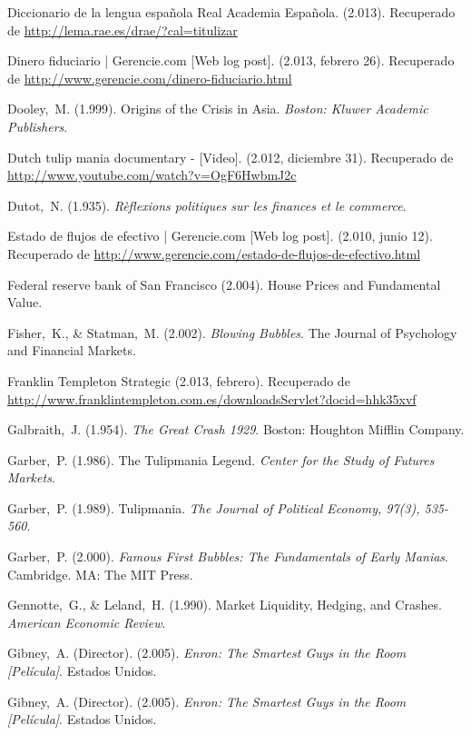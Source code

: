 \begin{thebibliography}{11}
	\bibitem{}
		Diccionario de la lengua española Real Academia Española. (2.013). Recuperado de \url{http://lema.rae.es/drae/?cal=titulizar}

	\bibitem{}
		Dinero fiduciario | Gerencie.com [Web log post]. (2.013, febrero 26). Recuperado de \url{http://www.gerencie.com/dinero-fiduciario.html}

	\bibitem{}
		Dooley, M. (1.999). Origins of the Crisis in Asia. \emph{Boston: Kluwer Academic Publishers}. 

	\bibitem{}
		Dutch tulip mania documentary - [Video]. (2.012, diciembre 31). Recuperado de \url{http://www.youtube.com/watch?v=OgF6HwbmJ2c}

	\bibitem{}
		Dutot, N. (1.935). \emph{Rèflexions politiques sur les finances et le commerce}. 

	\bibitem{}
		Estado de flujos de efectivo | Gerencie.com [Web log post]. (2.010, junio 12). Recuperado de \url{http://www.gerencie.com/estado-de-flujos-de-efectivo.html}

	\bibitem{}
		Federal reserve bank of San Francisco (2.004). House Prices and Fundamental Value. 	

	\bibitem{}
		Fisher, K., \& Statman, M. (2.002). \emph{Blowing Bubbles}. The Journal of Psychology and Financial Markets.

	\bibitem{}
		Franklin Templeton Strategic (2.013, febrero). Recuperado de \url{http://www.franklintempleton.com.es/downloadsServlet?docid=hhk35xvf}

	\bibitem{}
		Galbraith, J. (1.954). \emph{The Great Crash 1929}. Boston: Houghton Mifflin Company. 

	\bibitem{}
		Garber, P. (1.986). The Tulipmania Legend. \emph{Center for the Study of Futures Markets}. 

	\bibitem{}
		Garber, P. (1.989). Tulipmania. \emph{The Journal of Political Economy, 97(3), 535-560}.  	

	\bibitem{}
		Garber, P. (2.000). \emph{Famous First Bubbles: The Fundamentals of Early Manias}. Cambridge. MA: The MIT Press.
	
	\bibitem{}
		Gennotte, G., \& Leland, H. (1.990). Market Liquidity, Hedging, and Crashes. \emph{American Economic Review}.

	\bibitem{}
		Gibney, A. (Director). (2.005). \emph{Enron: The Smartest Guys in the Room [Película]}. Estados Unidos. 

	\bibitem{}
		Gibney, A. (Director). (2.005). \emph{Enron: The Smartest Guys in the Room [Película]}. Estados Unidos. 


\end{thebibliography}
